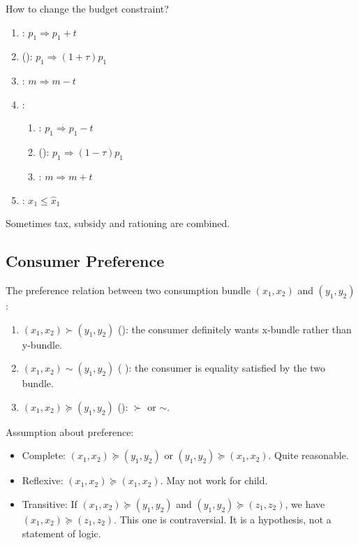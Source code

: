 How to change the budget constraint?
\begin{enumerate}
    \item {}: $p_1 \Rightarrow p_1 + t$
    \item {} (): $p_1 \Rightarrow (1+\tau)p_1$
    \item {}: $m \Rightarrow m - t$
    \item {}:
        \begin{enumerate}
            \item {}: $p_1 \Rightarrow p_1 - t$
            \item {} (): $p_1 \Rightarrow (1-\tau)p_1$
            \item {}: $m \Rightarrow m + t$
        \end{enumerate}
    \item {}: $x_1 \leq \hat{x}_1$
\end{enumerate}

Sometimes tax, subsidy and rationing are combined.




\subsection{Consumer Preference}

The preference relation between two consumption bundle $(x_1, x_2)$ and $(y_1, y_2)$:
\begin{enumerate}
    \item $(x_1,x_2) \succ (y_1,y_2)$ (): the consumer definitely wants x-bundle rather than y-bundle.
    \item $(x_1,x_2) \sim (y_1,y_2)$ ( ): the consumer is equality satisfied by the two bundle. 
    \item $(x_1,x_2) \succeq (y_1,y_2)$ (): $\succ$ or $\sim$.
\end{enumerate}


Assumption about preference:
\begin{itemize}
    \item Complete: $(x_1,x_2) \succeq (y_1,y_2)$ or $(y_1,y_2) \succeq (x_1,x_2)$. Quite reasonable.
    \item Reflexive: $(x_1,x_2) \succeq (x_1,x_2)$. May not work for child.
    \item Transitive: If $(x_1,x_2) \succeq (y_1,y_2)$ and $(y_1,y_2) \succeq (z_1,z_2)$, we have $(x_1,x_2) \succeq (z_1,z_2)$. This one is contraversial. It is a hypothesis, not a statement of logic.
\end{itemize}

